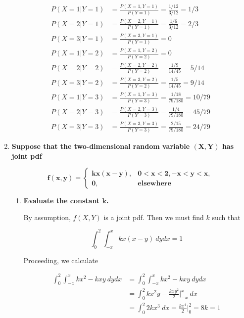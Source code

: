 \documentclass[10pt, oneside]{article}   	%
\theoremstyle{definition}
\begin{document}
\begin{enumerate}[label=6.\arabic*]
\begin{align*}
P(X = 1 | Y = 1) &= \frac{P(X = 1, Y = 1)}{P(Y = 1)} = \frac{1/12}{3/12} = \boxed{1/3} \\
P(X = 2 | Y = 1) &= \frac{P(X = 2, Y = 1)}{P(Y = 1)} = \frac{1/6}{3/12} = \boxed{2/3} \\
P(X = 3 | Y = 1) &= \frac{P(X = 3, Y = 1)}{P(Y = 1)} = \boxed{0} \\
P(X = 1 | Y = 2) &= \frac{P(X = 1, Y = 2)}{P(Y = 2)} = \boxed{0} \\
P(X = 2 | Y = 2) &= \frac{P(X = 2, Y = 2)}{P(Y = 2)} = \frac{1/9}{14/45} = \boxed{5/14} \\
P(X = 3 | Y = 2) &= \frac{P(X = 3, Y = 2)}{P(Y = 2)} = \frac{1/5}{14/45} = \boxed{9/14} \\
P(X = 1 | Y = 3) &= \frac{P(X = 1, Y = 3)}{P(Y = 3)} = \frac{1/18}{79/180} = \boxed{10/79} \\
P(X = 2 | Y = 3) &= \frac{P(X = 2, Y = 3)}{P(Y = 3)} = \frac{1/4}{79/180} = \boxed{45/79} \\
P(X = 3 | Y = 3) &= \frac{P(X = 3, Y = 3)}{P(Y = 3)} = \frac{2/15}{79/180} = \boxed{24/79}
\end{align*}

\item  \begin{tcolorbox}[
  colback=Cerulean!5!white,
  colframe=Cerulean!75!black]
\textbf{Suppose that the two-dimensional random variable $\bm{(X,Y)}$ has joint pdf}

\[ \bm{f(x,y) = } \begin{cases} \bm{kx(x-y)}, & \bm{0 < x < 2, -x < y < x,} \\
\bm{0}, & \textbf{elsewhere}
\end{cases} \]
\end{tcolorbox}

	\begin{enumerate}
	\item  \begin{tcolorbox}[
	  colback=Cerulean!5!white,
	  colframe=Cerulean!75!black]
	\textbf{Evaluate the constant $\bm{k}$.}
	\end{tcolorbox}
	
	By assumption, $f(X, Y)$ is a joint pdf. Then we must find $k$ such that
	
	\[ \int^2_0 \int^x_{-x} kx(x-y) \ dy dx = 1 \]
	
	Proceeding, we calculate
	
	\begin{align*}
	\int^2_0 \int^x_{-x} kx^2 - kxy \ dy dx &= \int^2_0 \int^x_{-x} kx^2 - kxy \ dy dx \\
	&= \int^2_0 kx^2 y - \frac{kxy^2}{2} \Big|^x_{-x} \ dx \\
	&= \int^2_0 2kx^3 \ dx = \frac{kx^4}{2} \Big|^2_0 = 8k = 1
	\end{align*}
	

\end{enumerate}
\end{enumerate}
\end{document}
